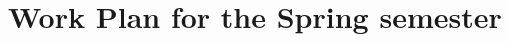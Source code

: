 \documentclass{layout/si-msc-proposal}
\begin{document}
    \section{Work Plan for the Spring semester}\label{sec:work-plan-for-the-spring-semester}
    


    \newpage
    \nocite{*}
    
\end{document}
